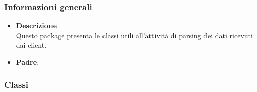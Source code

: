 \subsubsection{Informazioni generali}
\begin{itemize}
\item \textbf{Descrizione}\\
Questo package presenta le classi utili all'attività di parsing dei dati ricevuti dai client.
\item \textbf{Padre}: \hyperref[\nogloxy{swedesigner::server}]{}
\end{itemize}
\subsubsection{Classi}
\label{\nogloxy{swedesigner::server::parser::Parser}}
\begin{figure}[h]
\centering
{}
\caption{}
\end{figure}
\FloatBarrier
